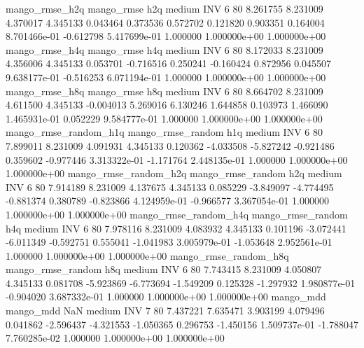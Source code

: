        mango_rmse_h2q        mango_rmse                  h2q     medium      INV                 6 80  8.261755       8.231009 4.370017       4.345133    0.043464      0.373536      0.572702     0.121820       0.903351  0.164004 8.701466e-01    -0.612798   5.417699e-01            1.000000    1.000000e+00        1.000000e+00
       mango_rmse_h4q        mango_rmse                  h4q     medium      INV                 6 80  8.172033       8.231009 4.356006       4.345133    0.053701     -0.716516      0.250241    -0.160424       0.872956  0.045507 9.638177e-01    -0.516253   6.071194e-01            1.000000    1.000000e+00        1.000000e+00
       mango_rmse_h8q        mango_rmse                  h8q     medium      INV                 6 80  8.664702       8.231009 4.611500       4.345133   -0.004013      5.269016      6.130246     1.644858       0.103973  1.466090 1.465931e-01     0.052229   9.584777e-01            1.000000    1.000000e+00        1.000000e+00
mango_rmse_random_h1q mango_rmse_random                  h1q     medium      INV                 6 80  7.899011       8.231009 4.091931       4.345133    0.120362     -4.033508     -5.827242    -0.921486       0.359602 -0.977446 3.313322e-01    -1.171764   2.448135e-01            1.000000    1.000000e+00        1.000000e+00
mango_rmse_random_h2q mango_rmse_random                  h2q     medium      INV                 6 80  7.914189       8.231009 4.137675       4.345133    0.085229     -3.849097     -4.774495    -0.881374       0.380789 -0.823866 4.124959e-01    -0.966577   3.367054e-01            1.000000    1.000000e+00        1.000000e+00
mango_rmse_random_h4q mango_rmse_random                  h4q     medium      INV                 6 80  7.978116       8.231009 4.083932       4.345133    0.101196     -3.072441     -6.011349    -0.592751       0.555041 -1.041983 3.005979e-01    -1.053648   2.952561e-01            1.000000    1.000000e+00        1.000000e+00
mango_rmse_random_h8q mango_rmse_random                  h8q     medium      INV                 6 80  7.743415       8.231009 4.050807       4.345133    0.081708     -5.923869     -6.773694    -1.549209       0.125328 -1.297932 1.980877e-01    -0.904020   3.687332e-01            1.000000    1.000000e+00        1.000000e+00
            mango_mdd         mango_mdd                  NaN     medium      INV                 7 80  7.437221       7.635471 3.903199       4.079496    0.041862     -2.596437     -4.321553    -1.050365       0.296753 -1.450156 1.509737e-01    -1.788047   7.760285e-02            1.000000    1.000000e+00        1.000000e+00
